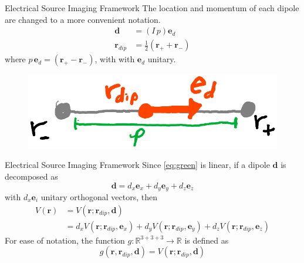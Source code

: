 \documentclass[progressbar=head]{beamer}
\newcommand{\ppar}[1]{ \left( #1 \right) }
\newcommand{\R}{\mathbb{R}}
\newcommand{\rr}{\mathbf{r}}
\begin{document}
\begin{frame}{Electrical Source Imaging Framework}
The location and momentum of each dipole are changed to a more convenient notation.
\begin{align}
\mathbf{d} &= \ppar{I\, p} \mathbf{e}_d \\
\rr_{dip} &= \frac{1}{2}\ppar{\rr_++\rr_-}
\end{align}
where 
$p\, \mathbf{e}_d = \ppar{\rr_+-\rr_-}$, with
with $\mathbf{e}_d$ unitary.
\begin{figure}
\centering
\includegraphics[width=0.4\linewidth]{./img_oldbeamer/sketch05}
\end{figure}
\end{frame}

\begin{frame}{Electrical Source Imaging Framework}
%
Since \eqref{eq:green} is linear, if a dipole $\mathbf{d}$ is decomposed as 
\begin{equation}
\mathbf{d} = d_x \mathbf{e}_x + d_y \mathbf{e}_y + d_z \mathbf{e}_z    
\end{equation}
with $d_x \mathbf{e}_i$ unitary orthogonal vectors, then
\begin{align}
V\ppar{\rr} &=
V\ppar{\rr; \rr_{dip}, \mathbf{d}} 
\nonumber \\
&=
d_x V\ppar{\rr; \rr_{dip}, \mathbf{e}_x} +
d_y V\ppar{\rr; \rr_{dip}, \mathbf{e}_y} +
d_z V\ppar{\rr; \rr_{dip}, \mathbf{e}_z}
\end{align}
For ease of notation, the function $g: \R^{3+3+3}\rightarrow \R$ is defined as
\begin{equation}
    g\ppar{\rr, \rr_{dip}, \mathbf{d}} = V\ppar{\rr; \rr_{dip}, \mathbf{d}}
\end{equation}
\end{frame}
\end{document}
